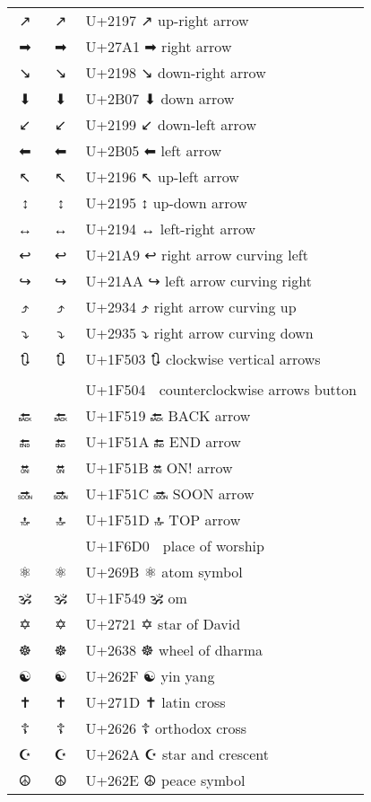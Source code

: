 \documentclass[a4paper,12pt]{ltjarticle}
\newcommand{\fontA}[1]{{\fontspec[RawFeature={mode=harf,+dist,+ccmp}]{Segoe UI Emoji} #1}}
\newcommand{\fontB}[1]{{\fontspec[RawFeature={mode=harf,+dist,+ccmp}]{Noto Color Emoji} #1}}
\begin{document}
\begin{longtable}[c]{ccp{0.8\linewidth}}
\fontA{↗}&\fontB{↗}&U+2197 ↗ up-right arrow\\
\fontA{➡}&\fontB{➡}&U+27A1 ➡ right arrow\\
\fontA{↘}&\fontB{↘}&U+2198 ↘ down-right arrow\\
\fontA{⬇}&\fontB{⬇}&U+2B07 ⬇ down arrow\\
\fontA{↙}&\fontB{↙}&U+2199 ↙ down-left arrow\\
\fontA{⬅}&\fontB{⬅}&U+2B05 ⬅ left arrow\\
\fontA{↖}&\fontB{↖}&U+2196 ↖ up-left arrow\\
\fontA{↕}&\fontB{↕}&U+2195 ↕ up-down arrow\\
\fontA{↔}&\fontB{↔}&U+2194 ↔ left-right arrow\\
\fontA{↩}&\fontB{↩}&U+21A9 ↩ right arrow curving left\\
\fontA{↪}&\fontB{↪}&U+21AA ↪ left arrow curving right\\
\fontA{⤴}&\fontB{⤴}&U+2934 ⤴ right arrow curving up\\
\fontA{⤵}&\fontB{⤵}&U+2935 ⤵ right arrow curving down\\
\fontA{🔃}&\fontB{🔃}&U+1F503 🔃 clockwise vertical arrows\\
\fontA{🔄}&\fontB{🔄}&U+1F504 🔄 counterclockwise arrows button\\
\fontA{🔙}&\fontB{🔙}&U+1F519 🔙 BACK arrow\\
\fontA{🔚}&\fontB{🔚}&U+1F51A 🔚 END arrow\\
\fontA{🔛}&\fontB{🔛}&U+1F51B 🔛 ON! arrow\\
\fontA{🔜}&\fontB{🔜}&U+1F51C 🔜 SOON arrow\\
\fontA{🔝}&\fontB{🔝}&U+1F51D 🔝 TOP arrow\\
\fontA{🛐}&\fontB{🛐}&U+1F6D0 🛐 place of worship\\
\fontA{⚛}&\fontB{⚛}&U+269B ⚛ atom symbol\\
\fontA{🕉}&\fontB{🕉}&U+1F549 🕉 om\\
\fontA{✡}&\fontB{✡}&U+2721 ✡ star of David\\
\fontA{☸}&\fontB{☸}&U+2638 ☸ wheel of dharma\\
\fontA{☯}&\fontB{☯}&U+262F ☯ yin yang\\
\fontA{✝}&\fontB{✝}&U+271D ✝ latin cross\\
\fontA{☦}&\fontB{☦}&U+2626 ☦ orthodox cross\\
\fontA{☪}&\fontB{☪}&U+262A ☪ star and crescent\\
\fontA{☮}&\fontB{☮}&U+262E ☮ peace symbol\\

\end{longtable}
\end{document}
